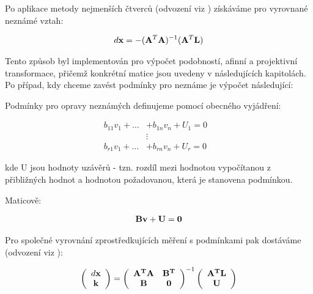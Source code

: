 Po aplikace metody nejmenších čtverců (odvození viz \cite{vyrovnani}) získáváme
pro vyrovnané neznámé vztah:

\begin{eqnarray} \label{ata}
 d{\bf x} = -({\bf A}^T {\bf A} )^{-1}({\bf A}^T {\bf L}) 
\end{eqnarray}

Tento způsob byl implementován pro výpočet podobností, afinní a projektivní
transformace, přičemž konkrétní matice jsou uvedeny v následujících kapitolách.
Po případ, kdy chceme zavést podmínky pro neznáme je výpočet následující:

Podmínky pro opravy neznámých definujeme pomocí obecného vyjádření:

\begin{eqnarray} \label{podminky}
b_{11} v_1 + \ldots &+ b_{1n} v_n + U_1=0 \\\nonumber
& \vdots &\\
b_{r1} v_1 + \ldots &+ b_{rn} v_n + U_r=0 \nonumber
\end{eqnarray}

kde U jsou hodnoty uzávěrů - tzn. rozdíl mezi hodnotou vypočítanou z
přibližných hodnot a hodnotou požadovanou, která je stanovena podmínkou.

Maticově:

\begin{eqnarray} \label{podminky} 
{\bf Bv} + \bf{U} = {\bf 0}
\end{eqnarray}

Pro společné vyrovnání zprostředkujících měření s podmínkami pak dostáváme
(odvození viz \cite{vyrovnani}):

\begin{eqnarray} \label{vyropr}
\left(
\begin{array}{c}
d{\bf x}\\
\bf k\\ 
\end{array} \right) 
=  \left( 
\begin{array}{cc}
\bf A ^T \bf A & \bf B^T \\
\bf B          & \bf 0
\end{array}\right)^{-1}
\left( 
\begin{array}{c}
\bf A ^T \bf L \\
\bf U
\end{array}\right) 
\end{eqnarray}

